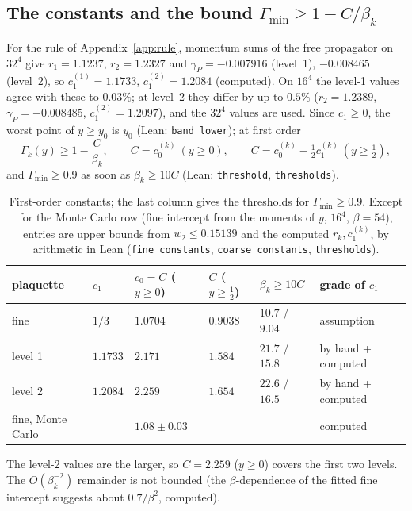 \documentclass[11pt,a4paper]{article}
\theoremstyle{definition}
\theoremstyle{remark}
\newcommand{\code}[1]{\texttt{#1}}
\begin{document}
\subsection{The constants and the bound \texorpdfstring{$\Gamma_{\min}\ge1-C/\beta_k$}{Gamma min}}\label{sec:constants}

For the rule of Appendix~\ref{app:rule}, momentum sums of the free propagator on $32^4$ give $r_1=1.1237$, $r_2=1.2327$ and $\gamma_P=-0.007916$ (level~1), $-0.008465$ (level~2), so $c_1^{(1)}=1.1733$, $c_1^{(2)}=1.2084$ (computed). On $16^4$ the level-1 values agree with these to $0.03\%$; at level~2 they differ by up to $0.5\%$ ($r_2=1.2389$, $\gamma_P=-0.008485$, $c_1^{(2)}=1.2097$), and the $32^4$ values are used. Since $c_1\ge0$, the worst point of $y\ge y_0$ is $y_0$ (Lean: \code{band\_lower}); at first order
\[
\Gamma_k(y)\ge1-\frac{C}{\beta_k},\qquad C=c_0^{(k)}\ (y\ge0),\qquad C=c_0^{(k)}-\tfrac12c_1^{(k)}\ (y\ge\tfrac12),
\]
and $\Gamma_{\min}\ge0.9$ as soon as $\beta_k\ge10C$ (Lean: \code{threshold}, \code{thresholds}).

\begin{table}[ht]\centering\small
\caption{First-order constants; the last column gives the thresholds for $\Gamma_{\min}\ge0.9$. Except for the Monte Carlo row (fine intercept from the moments of $y$, $16^4$, $\beta=54$), entries are upper bounds from $w_2\le0.15139$ and the computed $r_k,c_1^{(k)}$, by arithmetic in Lean (\code{fine\_constants}, \code{coarse\_constants}, \code{thresholds}).}\label{tab:const}
\begin{tabular}{@{}llllll@{}}\toprule
plaquette & $c_1$ & $c_0=C$ ($y\ge0$) & $C$ ($y\ge\frac12$) & $\beta_k\ge10C$ & grade of $c_1$\\\midrule
fine & $1/3$ & $1.0704$ & $0.9038$ & $10.7$ / $9.04$ & assumption\\
level 1 & $1.1733$ & $2.171$ & $1.584$ & $21.7$ / $15.8$ & by hand + computed\\
level 2 & $1.2084$ & $2.259$ & $1.654$ & $22.6$ / $16.5$ & by hand + computed\\\midrule
fine, Monte Carlo & & $1.08\pm0.03$ & & & computed\\\bottomrule
\end{tabular}
\end{table}

The level-2 values are the larger, so $C=2.259$ ($y\ge0$) covers the first two levels. The $O(\beta_k^{-2})$ remainder is not bounded (the $\beta$-dependence of the fitted fine intercept suggests about $0.7/\beta^2$, computed).
\end{document}
